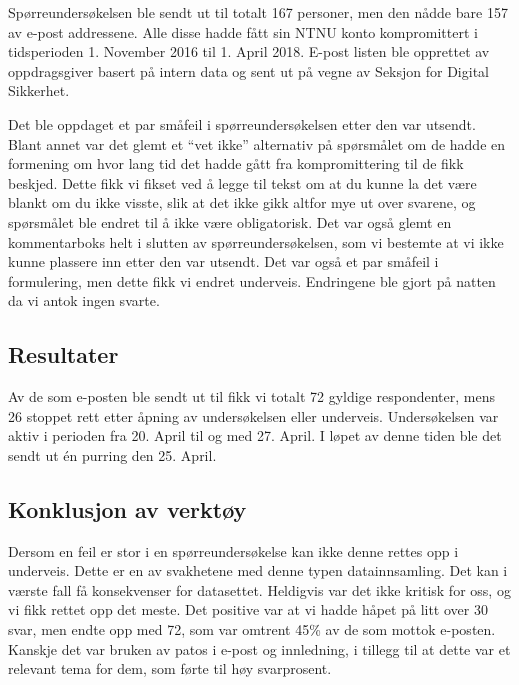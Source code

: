 Spørreundersøkelsen ble sendt ut til totalt 167 personer, men den nådde bare 157 av e-post addressene. Alle disse hadde fått sin NTNU konto kompromittert i tidsperioden 1. November 2016 til 1. April 2018. E-post listen ble opprettet av oppdragsgiver basert på intern data og sent ut på vegne av Seksjon for Digital Sikkerhet. 

Det ble oppdaget et par småfeil i spørreundersøkelsen etter den var utsendt. Blant annet var det glemt et ``vet ikke'' alternativ på spørsmålet om de hadde en formening om hvor lang tid det hadde gått fra kompromittering til de fikk beskjed. Dette fikk vi fikset ved å legge til tekst om at du kunne la det være blankt om du ikke visste, slik at det ikke gikk altfor mye ut over svarene, og spørsmålet ble endret til å ikke være obligatorisk. Det var også glemt en kommentarboks helt i slutten av spørreundersøkelsen, som vi bestemte at vi ikke kunne plassere inn etter den var utsendt. Det var også et par småfeil i formulering, men dette fikk vi endret underveis. Endringene ble gjort på natten da vi antok ingen svarte. 

\subsection{Resultater}
Av de som e-posten ble sendt ut til fikk vi totalt 72 gyldige respondenter, mens 26 stoppet rett etter åpning av undersøkelsen eller underveis. Undersøkelsen var aktiv i perioden fra 20. April til og med 27. April. I løpet av denne tiden ble det sendt ut én purring den 25. April. 

\subsection{Konklusjon av verktøy}
Dersom en feil er stor i en spørreundersøkelse kan ikke denne rettes opp i underveis. Dette er en av svakhetene med denne typen datainnsamling. Det kan i værste fall få konsekvenser for datasettet. Heldigvis var det ikke kritisk for oss, og vi fikk rettet opp det meste. Det positive var at vi hadde håpet på litt over 30 svar, men endte opp med 72, som var omtrent 45\% av de som mottok e-posten. Kanskje det var bruken av patos i e-post og innledning, i tillegg til at dette var et relevant tema for dem, som førte til høy svarprosent. 
